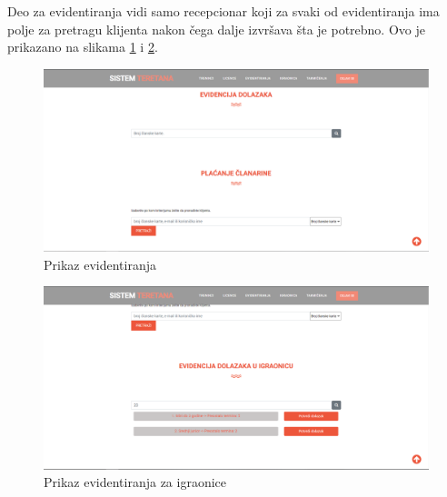 \documentclass[../main.tex]{subfiles}
\begin{document}
Deo za evidentiranja vidi samo recepcionar koji za svaki od evidentiranja ima polje za pretragu klijenta nakon čega dalje izvršava šta je potrebno. Ovo je prikazano na slikama \ref{fig:evidentiranja} i \ref{fig:evidentiranja_igraonice}.

\begin{figure}[!ht]
\begin{center}
\includegraphics[scale=0.35]{sections/korisnicki_interfejs/screenshots/evidentiranja.PNG}
\end{center}
\caption{Prikaz evidentiranja}
\label{fig:evidentiranja}
\end{figure}


\begin{figure}[!ht]
\begin{center}
\includegraphics[scale=0.35]{sections/korisnicki_interfejs/screenshots/evidentiranja_igraonica.PNG}
\end{center}
\caption{Prikaz evidentiranja za igraonice}
\label{fig:evidentiranja_igraonice}
\end{figure}
\end{document}
